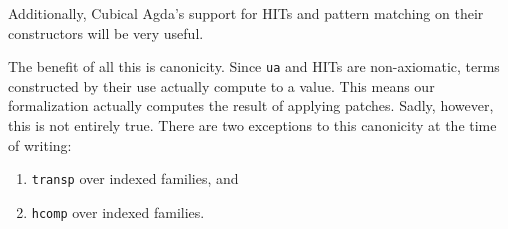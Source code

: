 Additionally, Cubical Agda's support for HITs and pattern matching on their
constructors will be very useful.

The benefit of all this is canonicity. Since \texttt{ua} and HITs are non-axiomatic,
terms constructed by their use actually compute to a value. This means our
formalization actually computes the result of applying patches. Sadly, however,
this is not entirely true. There are two exceptions to this canonicity at the
time of writing:
\begin{enumerate}
\item \texttt{transp} over indexed families, and
\item \texttt{hcomp} over indexed families.
\end{enumerate}
